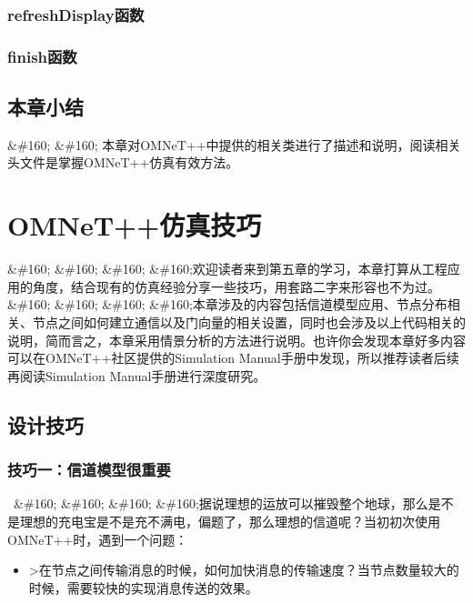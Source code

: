 \subsection{refreshDisplay函数}
\label{refreshdisplay函数}

\subsection{finish函数}
\label{finish函数}

\section{本章小结}
\label{本章小结}

\&\#160; \&\#160; 本章对OMNeT++中提供的相关类进行了描述和说明，阅读相关头文件是掌握OMNeT++仿真有效方法。

\chapter{OMNeT++仿真技巧}
\label{omnet仿真技巧}

\&\#160; \&\#160; \&\#160; \&\#160;欢迎读者来到第五章的学习，本章打算从工程应用的角度，结合现有的仿真经验分享一些技巧，用套路二字来形容也不为过。
\&\#160; \&\#160; \&\#160; \&\#160;本章涉及的内容包括信道模型应用、节点分布相关、节点之间如何建立通信以及门向量的相关设置，同时也会涉及以上代码相关的说明，简而言之，本章采用情景分析的方法进行说明。也许你会发现本章好多内容可以在OMNeT++社区提供的Simulation Manual手册中发现，所以推荐读者后续再阅读Simulation Manual手册进行深度研究。

\section{设计技巧}
\label{设计技巧}

\subsection{技巧一：信道模型很重要}
\label{技巧一：信道模型很重要}

 \&\#160; \&\#160; \&\#160; \&\#160;据说理想的运放可以摧毁整个地球，那么是不是理想的充电宝是不是充不满电，偏题了，那么理想的信道呢？当初初次使用OMNeT++时，遇到一个问题：

\begin{itemize}
\item >在节点之间传输消息的时候，如何加快消息的传输速度？当节点数量较大的时候，需要较快的实现消息传送的效果。

\end{itemize}


